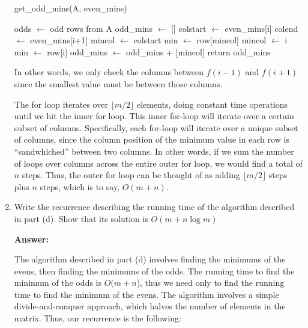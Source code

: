 \documentclass[]{book}
\theoremstyle{definition}
\begin{document}
\begin{enumerate}[label=\alph*.]
            \begin{algorithm}[H]
            \caption{get\_odd\_mins(A, even\_mins)}
            \begin{algorithmic}[1]
            \STATE odds $\leftarrow$ odd rows from A
            \STATE odd\_mins $\leftarrow$ []
                \STATE colstart $\leftarrow$ even\_mins[i]
                \STATE colend $\leftarrow$ even\_mins[i+1]
                \STATE mincol $\leftarrow$ colstart
                \STATE min $\leftarrow$ row[mincol]
                        \STATE mincol $\leftarrow$ i
                        \STATE min $\leftarrow$ row[i]
                    \ENDIF
                \ENDFOR
                \STATE odd\_mins $\leftarrow$ odd\_mins + [mincol]
            \ENDFOR
            \STATE return odd\_mins
            \end{algorithmic}
            \end{algorithm}

        In other words, we only check the columns between $f(i-1)$ and $f(i+1)$ since the
        smallest value must be between those columns.

        The for loop iterates over $\lfloor m/2 \rfloor$ elements,
        doing constant time operations until we hit the inner for loop.
        This inner for-loop will iterate over a certain subset of
        columns. Specifically, each for-loop will iterate over
        a unique subset of columns, since the column position
        of the minimum value in each row is ``sandwhiched'' between
        two columns. In other words, if we sum the number of
        loops over columns across the entire outer for loop,
        we would find a total of $n$ steps. Thus,
        the outer for loop can be thought of as adding 
        $\lfloor m/2 \rfloor$ steps plus $n$ steps, which
        is to say, $O(m+n)$.

    \item Write the recurrence describing the running time of the algorithm described in part (d).
          Show that its solution is $O(m + n\log m)$

        \textbf{Answer:} 

          The algorithm described in part (d) involves finding the minimums of the evens,
          then finding the minimums of the odds. The running time to find the minimum
          of the odds is $O(m+n$), thus we need only to find the running time
          to find the minimum of the evens. The algorithm involves
          a simple divide-and-conquer approach, which halves the number 
          of elements in the matrix. Thus, our recurrence is the following:


\end{enumerate}
\end{document}
